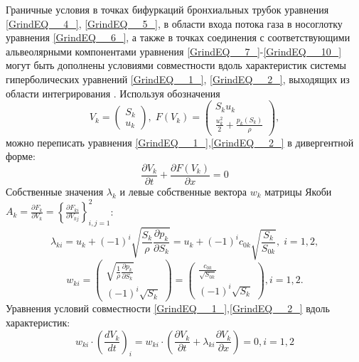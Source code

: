 Граничные условия в точках бифуркаций бронхиальных трубок уравнения \eqref{GrindEQ__4_}, \eqref{GrindEQ__5_}, в области входа потока газа в носоглотку уравнения \eqref{GrindEQ__6_}, а также в точках соединения с соответствующими альвеолярными компонентами уравнения \eqref{GrindEQ__7_}-\eqref{GrindEQ__10_} могут быть дополнены условиями совместности вдоль характеристик системы гиперболических уравнений \eqref{GrindEQ__1_}, \eqref{GrindEQ__2_}, выходящих из области интегрирования \cite{Simakov08b,Kholodov2006}. Используя обозначения 
\begin{equation} \label{GrindEQ__14_} 
V_{k} =\left(\begin{array}{c} {S_{k} } \\ {u_{k} } \end{array}\right),\; F\left(V_{k} \right)=\left(\begin{array}{c} {S_{k} u_{k} } \\ {\frac{u_{k}^{2} }{2} +\frac{p_{k} \left(S_{k} \right)}{\rho } } \end{array}\right),  
\end{equation} 
можно переписать уравнения \eqref{GrindEQ__1_},\eqref{GrindEQ__2_} в дивергентной форме:
\begin{equation} \label{GrindEQ__15_} 
\frac{\partial V_{k} }{\partial t} +\frac{\partial F\left(V_{k} \right)}{\partial x} =0 
\end{equation} 
Собственные значения $\lambda _{k} $ и левые собственные вектора $w_{k} $ матрицы Якоби $A_{k} =\frac{\partial F_{k} }{\partial V_{k} } =\left\{\frac{\partial F_{ki} }{\partial V_{kj} } \right\}_{i,j=1}^{2} $:
\begin{equation} \label{GrindEQ__16_} 
\lambda _{ki} =u_{k} +\left(-1\right)^{i} \sqrt{\frac{S_{k} }{\rho } \frac{\partial p_{k} }{\partial S_{k} } } =u_{k} +\left(-1\right)^{i} c_{0k} \sqrt{\frac{S_{k} }{S_{0k} } } ,\; i=1,2,  
\end{equation} 
\begin{equation} \label{GrindEQ__17_} 
w_{ki} =\left(\begin{array}{c} {\sqrt{\frac{1}{\rho } \frac{\partial p_{k} }{\partial S_{k} } } } \\ {\left(-1\right)^{i} \sqrt{S_{k} } } \end{array}\right)=\left(\begin{array}{c} {\frac{c_{0k} }{\sqrt{S_{0k} } } } \\ {\left(-1\right)^{i} \sqrt{S_{k} } } \end{array}\right), i=1,2.  
\end{equation} 
Уравнения условий совместности \eqref{GrindEQ__1_},\eqref{GrindEQ__2_} вдоль характеристик:
\begin{equation} \label{GrindEQ__18_} 
w_{ki} \cdot \left(\frac{dV_{k} }{dt} \right)_{i} =w_{ki} \cdot \left(\frac{\partial V_{k} }{\partial t} +\lambda _{ki} \frac{\partial V_{k} }{\partial x} \right)=0, i=1,2 
\end{equation} 


